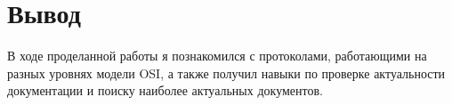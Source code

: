 \chapter{Вывод}
\label{ch:chap3}

В ходе проделанной работы я познакомился с протоколами, работающими на разных уровнях модели OSI, а также получил навыки по 
проверке актуальности документации и поиску наиболее актуальных документов.

\endinput